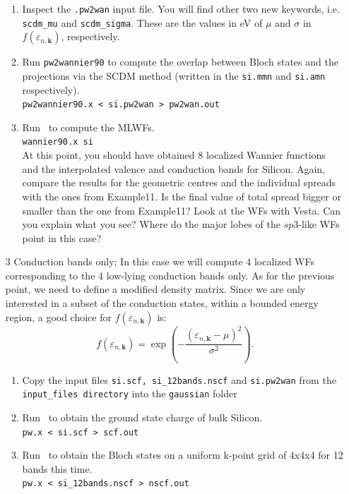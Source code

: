 \documentclass[a4paper,11pt,twoside]{article}
\begin{document}
\begin{itemize}
\begin{enumerate}
    \item Inspect the {\tt .pw2wan} input file. You will find other two new keywords, i.e. {\tt scdm\_mu} and {\tt scdm\_sigma}. These are the values in eV of $\mu$ and $\sigma$ in $f(\varepsilon_{n,\mathbf{k}})$, respectively.
    \item Run {\tt pw2wannier90} to compute the overlap between Bloch
    states and the projections via the SCDM method (written in the
    {\tt si.mmn} and {\tt si.amn} respectively).\\  
    {\tt pw2wannier90.x < si.pw2wan > pw2wan.out}

    \item Run \wannier\ to compute the MLWFs.\\
    {\tt wannier90.x si}\\
    At this point, you should have obtained 8 localized Wannier functions and the interpolated valence and conduction bands for Silicon. Again, compare the results for the geometric centres and the individual spreads with the ones from Example11. Is the final value of total spread bigger or smaller than the one from Example11? Look at the WFs with Vesta. Can you explain what you see? Where do the major lobes of the $sp3$-like WFs point in this case?  
  \end{enumerate}
  \item[3]{Conduction bands only: In this case we will compute 4 localized WFs corresponding to the 4 low-lying conduction bands only. As for the previous point, we need to define a modified density matrix\cite{LinLin-ArXiv2017}. Since we are only interested in a subset of the conduction states, within a bounded energy region, a good choice for $f(\varepsilon_{n,\mathbf{k}})$ is: $$f(\varepsilon_{n,\mathbf{k}}) = \exp\left(-\frac{(\varepsilon_{n,\mathbf{k}} - \mu)^2}{\sigma^2}\right).$$}
    \begin{enumerate}
    \item Copy the input files {\tt si.scf, si\_12bands.nscf} and {\tt si.pw2wan} from the {\tt input\_files directory} into the {\tt gaussian} folder
    \item Run \pwscf\ to obtain the ground state charge of bulk Silicon. \\
    {\tt pw.x < si.scf > scf.out}

    \item Run \pwscf\ to obtain the Bloch states on a uniform k-point grid of 4x4x4 for 12 bands this time. \\
    {\tt pw.x < si\_12bands.nscf > nscf.out}
    

\end{enumerate}
\end{itemize}
\end{document}
